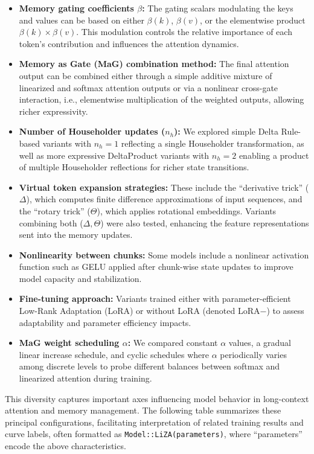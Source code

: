 \documentclass[10pt,a4paper]{article}
\begin{document}
\begin{itemize}
    \item \textbf{Memory gating coefficients \(\beta\):} The gating scalars modulating the keys and values can be based on either \(\beta(k)\), \(\beta(v)\), or the elementwise product \(\beta(k) \times \beta(v)\). This modulation controls the relative importance of each token's contribution and influences the attention dynamics.
    \item \textbf{Memory as Gate (MaG) combination method:} The final attention output can be combined either through a simple additive mixture of linearized and softmax attention outputs or via a nonlinear cross-gate interaction, i.e., elementwise multiplication of the weighted outputs, allowing richer expressivity.
    \item \textbf{Number of Householder updates (\(n_h\)):} We explored simple Delta Rule-based variants with \(n_h=1\) reflecting a single Householder transformation, as well as more expressive DeltaProduct variants with \(n_h=2\) enabling a product of multiple Householder reflections for richer state transitions.
    \item \textbf{Virtual token expansion strategies:} These include the “derivative trick” (\(\Delta\)), which computes finite difference approximations of input sequences, and the “rotary trick” (\(\Theta\)), which applies rotational embeddings. Variants combining both (\(\Delta,\Theta\)) were also tested, enhancing the feature representations sent into the memory updates.
    \item \textbf{Nonlinearity between chunks:} Some models include a nonlinear activation function such as GELU applied after chunk-wise state updates to improve model capacity and stabilization.
    \item \textbf{Fine-tuning approach:} Variants trained either with parameter-efficient Low-Rank Adaptation (LoRA) or without LoRA (denoted LoRA\(-\)) to assess adaptability and parameter efficiency impacts.
    \item \textbf{MaG weight scheduling \(\alpha\):} We compared constant \(\alpha\) values, a gradual linear increase schedule, and cyclic schedules where \(\alpha\) periodically varies among discrete levels to probe different balances between softmax and linearized attention during training.
\end{itemize}

This diversity captures important axes influencing model behavior in long-context attention and memory management. The following table summarizes these principal configurations, facilitating interpretation of related training results and curve labels, often formatted as \texttt{Model::LiZA(parameters)}, where “parameters” encode the above characteristics.
\end{document}
